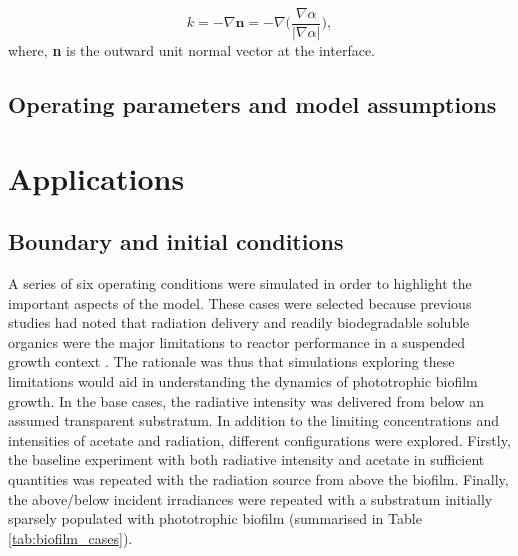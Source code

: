 \begin{equation}
    \label{eq:curvature}
    k = -\nabla \mathbf{n} = -\nabla \Bigg(\frac{\nabla \alpha}{\big| \nabla \alpha\big|} \Bigg),
\end{equation}
where, \textbf{n} is the outward unit normal vector at the interface.

\subsection{Operating parameters and model assumptions}


\section{Applications}
\subsection{Boundary and initial conditions}
A series of six operating conditions were simulated in order to highlight the important aspects of the model. These cases were selected because previous studies had noted that radiation delivery and readily biodegradable soluble organics were the major limitations to reactor performance in a suspended growth context \cite{Hulsen2016, Hulsen2016a}. The rationale was thus that simulations exploring these limitations would aid in understanding the dynamics of phototrophic biofilm growth. In the base cases, the radiative intensity was delivered from below an assumed transparent substratum. In addition to the limiting concentrations and intensities of acetate and radiation, different configurations were explored. Firstly, the baseline experiment with both radiative intensity and acetate in sufficient quantities was repeated with the radiation source from above the biofilm. Finally, the above/below incident irradiances were repeated with a substratum initially sparsely populated with phototrophic biofilm (summarised in Table \ref{tab:biofilm_cases}). 

